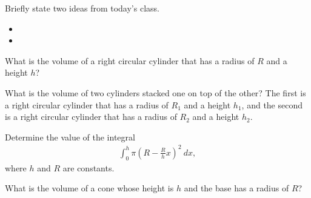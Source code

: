 \postClass

\begin{problem}
\item Briefly state two ideas from today's class.
  \begin{itemize}
  \item
  \item
  \end{itemize}
\end{problem}


\begin{problem}
  \item What is the volume of a right circular cylinder that has a radius of $R$ and a height $h$?

    \vspace{3em}

  \item What is the volume of two cylinders stacked one on top of the other?
    The first is a right circular cylinder that has a radius of $R_1$ and a height $h_1$,
    and the second is a right circular cylinder that has a radius of $R_2$ and a height
    $h_2$.

    \vspace{3em}

\item Determine the value of the integral
  \begin{eqnarray*}
    \int^h_0 \pi \left (R-\frac{R}{h} x\right)^2 ~ dx,
  \end{eqnarray*}
  where $h$ and $R$ are constants.
  \vfill

\item What is the volume of a cone whose height is $h$ and the base
  has a radius of $R$?
  \vspace{2em}

\end{problem}


